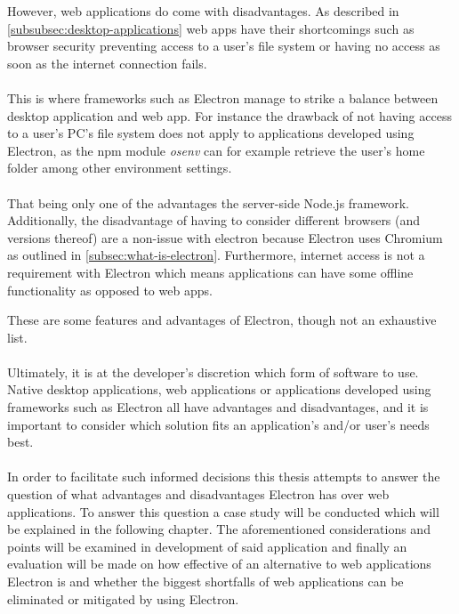 
However, web applications do come with disadvantages. 
As described in \ref{subsubsec:desktop-applications} web apps have their shortcomings such as 
browser security preventing access to a user's file system or having no access as soon as the internet connection
fails.\paragraph{}
This is where frameworks such as Electron manage to strike a balance between desktop application and web app.
For instance the drawback of not having access to a user's PC's file system does not apply to applications 
developed using Electron, as the \acrshort{npm} module \emph{osenv} can for example retrieve the user's home folder among 
other environment settings. \parencite{osenv}\paragraph{}
That being only one of the advantages the server-side Node.js framework. 
Additionally, the disadvantage of having to consider different browsers (and versions thereof) are a non-issue
with electron because Electron uses Chromium as outlined in \ref{subsec:what-is-electron}. 
Furthermore, internet access is not a requirement with Electron which means applications can have some offline
functionality as opposed to web apps.\par
These are some features and advantages of Electron, though not an exhaustive list. \parencite{electronDocs}\paragraph{}
Ultimately, it is at the developer's discretion which form of software to use.
Native desktop applications, web applications or applications developed using frameworks such as Electron 
all have advantages and disadvantages, and it is important to consider
which solution fits an application's and/or user's needs best.\paragraph{}
In order to facilitate such informed decisions this thesis attempts to answer the question of what advantages
and disadvantages Electron has over web applications.
To answer this question a case study will be conducted which will be explained in the following chapter.
The aforementioned considerations and points will be examined in development of said application and 
finally an evaluation will be made on how effective of an alternative to web applications Electron is 
and whether the biggest shortfalls of web applications can be eliminated or mitigated by 
using Electron.